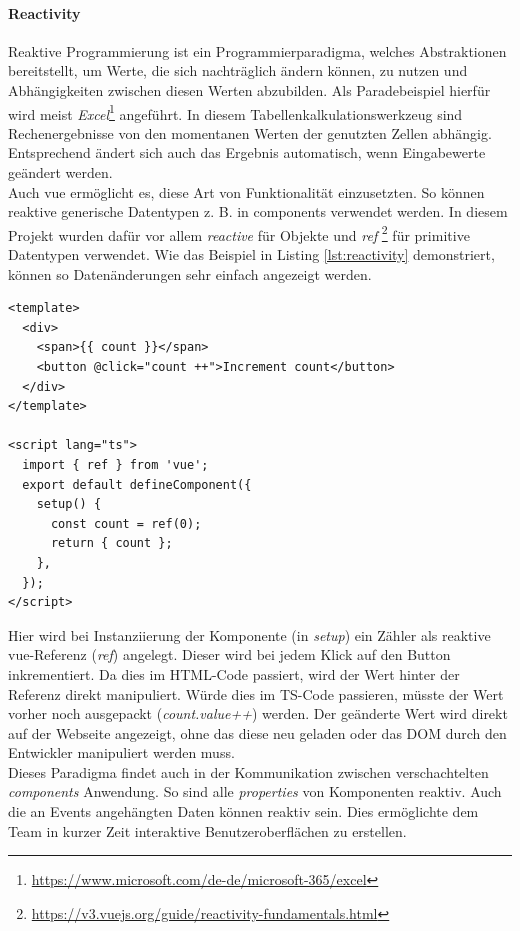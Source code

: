 \documentclass[10pt, a4paper]{article}
\begin{document}
\paragraph*{Reactivity}
Reaktive Programmierung ist ein Programmierparadigma, welches Abstraktionen bereitstellt,
 um Werte, die sich nachträglich ändern können, zu nutzen
 und Abhängigkeiten zwischen diesen Werten abzubilden. \cite{ReactiveProgramming}
Als Paradebeispiel hierfür wird meist
 \textit{Excel}\footnote{\raggedright\url{https://www.microsoft.com/de-de/microsoft-365/excel}} angeführt.
In diesem Tabellenkalkulationswerkzeug sind Rechenergebnisse von den momentanen Werten der genutzten Zellen abhängig.
Entsprechend ändert sich auch das Ergebnis automatisch, wenn Eingabewerte geändert werden. \\
Auch vue ermöglicht es, diese Art von Funktionalität einzusetzten.
So können reaktive generische Datentypen z. B. in components verwendet werden.
In diesem Projekt wurden dafür vor allem \textit{reactive} für Objekte und \textit{ref}
  \footnote{\raggedright\url{https://v3.vuejs.org/guide/reactivity-fundamentals.html}} für primitive Datentypen verwendet.
Wie das Beispiel in Listing \ref{lst:reactivity} demonstriert, können so Datenänderungen sehr einfach angezeigt werden.

\begin{lstlisting}[caption={Demonstration reaktivier vue-Referenzen}, captionpos=b, label=lst:reactivity]
  <template>
  <div>
    <span>{{ count }}</span>
    <button @click="count ++">Increment count</button>
  </div>
</template>

<script lang="ts">
  import { ref } from 'vue';
  export default defineComponent({
    setup() {
      const count = ref(0);
      return { count };
    },
  });
</script>
\end{lstlisting}
Hier wird bei Instanziierung der Komponente (in \textit{setup}) ein Zähler als reaktive vue-Referenz (\textit{ref}) angelegt.
Dieser wird bei jedem Klick auf den Button inkrementiert.
Da dies im HTML-Code passiert, wird der Wert hinter der Referenz direkt manipuliert.
Würde dies im TS-Code passieren, müsste der Wert vorher noch \glqq ausgepackt\grqq{} (\textit{count.value++}) werden.
Der geänderte Wert wird direkt auf der Webseite angezeigt,
 ohne das diese neu geladen oder das DOM durch den Entwickler manipuliert werden muss.
\\
Dieses Paradigma findet auch in der Kommunikation zwischen verschachtelten \textit{components} Anwendung.
So sind alle \textit{properties} von Komponenten reaktiv. Auch die an Events angehängten Daten können reaktiv sein.
Dies ermöglichte dem Team in kurzer Zeit interaktive Benutzeroberflächen zu erstellen.
\end{document}
